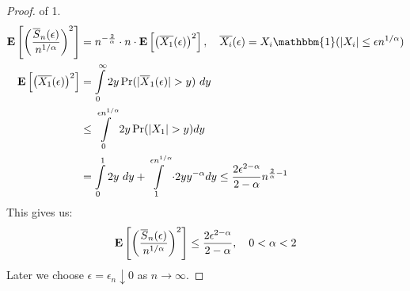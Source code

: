 \documentclass[../main/main.tex]{subfiles}
\begin{document}
\begin{proof} of 1.
	\begin{align*}
		\E \left[\left( \frac{\overline{S}_n(\epsilon)}{n ^{1 / \alpha}} \right)^2  \right] & = n^{- \frac{2}{\alpha}} \cdot n \cdot \E\left[\left( \overline{X_1}(\epsilon) \right)^2\right], \quad \overline{X_i}(\epsilon) = X_i \mathbbm{1}(|X_i| \leq \epsilon n ^{1 / \alpha})                                                              \\
		\E\left[\left( \overline{X_1}(\epsilon) \right)^2\right]                            & = \int\limits_{0}^{\infty} 2 y \Pr(|\overline{X}_1(\epsilon)| > y) ~ dy                                                                                                                                                                             \\
		                                                                                    & \leq \int\limits_{0}^{\epsilon n^{1 / \alpha}}       2 y \Pr(|X_1 | > y) dy                                                                                                                                                                         \\
		                                                                                    & = \int\limits_{0}^{1} 2y  ~dy + \int\limits_{1}^{\epsilon n ^{ 1 / \alpha}}\cdot 2y y^{-\alpha}             dy                                                                   \leq \frac{2 \epsilon^{2-\alpha}}{2-\alpha} n^{\frac{2}{\alpha}-1}
	\end{align*}
	This gives us: \[
		\text{\textbf{E}} \left[\left( \frac{\overline{S}_n(\epsilon)}{n ^{1 / \alpha}} \right)^2  \right] \leq\frac{2 \epsilon^{2-\alpha}}{2-\alpha} , \quad 0<\alpha< 2
	\]
	Later we choose $\epsilon = \epsilon_n \downarrow 0$ as $n \to \infty$.
\end{proof}
\end{document}
